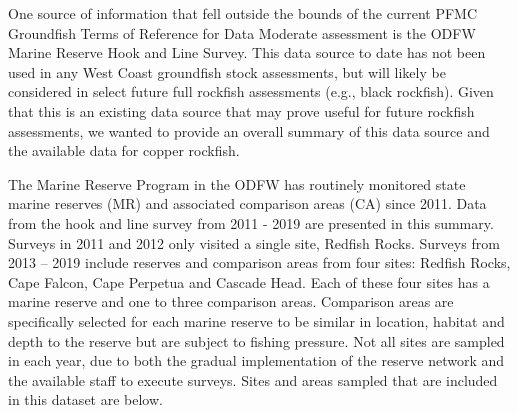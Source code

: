 \documentclass[11pt,
  english,
  a4paper,
]{article}
\begin{document}
\leavevmode\tagmcend\tagstructend


One source of information that fell outside the bounds of the current PFMC Groundfish Terms of Reference for Data Moderate assessment is the ODFW Marine Reserve Hook and Line Survey. This data source to date has not been used in any West Coast groundfish stock assessments, but will likely be considered in select future full rockfish assessments (e.g., black rockfish). Given that this is an existing data source that may prove useful for future rockfish assessments, we wanted to provide an overall summary of this data source and the available data for copper rockfish.

\leavevmode\tagmcend\tagstructend\par


The Marine Reserve Program in the ODFW has routinely monitored state marine reserves (MR) and associated comparison areas (CA) since 2011. Data from the hook and line survey from 2011 - 2019 are presented in this summary. Surveys in 2011 and 2012 only visited a single site, Redfish Rocks. Surveys from 2013 -- 2019 include reserves and comparison areas from four sites: Redfish Rocks, Cape Falcon, Cape Perpetua and Cascade Head. Each of these four sites has a marine reserve and one to three comparison areas. Comparison areas are specifically selected for each marine reserve to be similar in location, habitat and depth to the reserve but are subject to fishing pressure. Not all sites are sampled in each year, due to both the gradual implementation of the reserve network and the available staff to execute surveys. Sites and areas sampled that are included in this dataset are below.

\leavevmode\tagmcend\tagstructend\par

\begingroup\fontsize{10}{12}\selectfont
\begingroup\fontsize{10}{12}\selectfont
\end{document}
